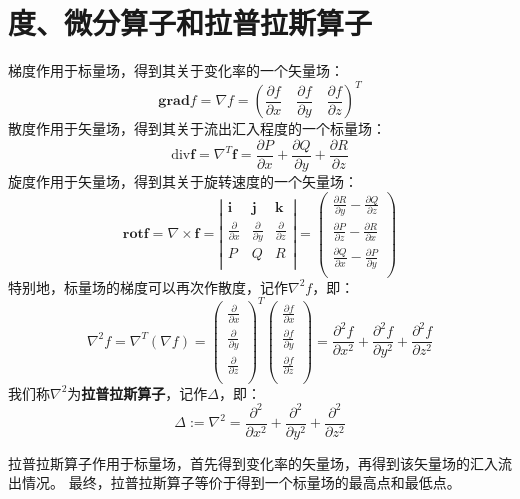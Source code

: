 \section{度、微分算子和拉普拉斯算子}

梯度作用于标量场，得到其关于变化率的一个矢量场：
\[
\mathbf{grad}f=\nabla f=\left( \frac{\partial f}{\partial x} \quad \frac{\partial f}{\partial y} \quad \frac{\partial f}{\partial z} \right) ^T
\]
散度作用于矢量场，得到其关于流出汇入程度的一个标量场：
\[
\mathrm{div}\boldsymbol{f}=\nabla ^T\boldsymbol{f}=\frac{\partial P}{\partial x}+\frac{\partial Q}{\partial y}+\frac{\partial R}{\partial z}
\]
旋度作用于矢量场，得到其关于旋转速度的一个矢量场：
\[
\mathbf{rot}\boldsymbol{f}=\nabla \times \boldsymbol{f}=\left| \begin{matrix}
	\mathbf{i}&		\mathbf{j}&		\mathbf{k}\\
	\frac{\partial}{\partial x}&		\frac{\partial}{\partial y}&		\frac{\partial}{\partial z}\\
	P&		Q&		R\\
\end{matrix} \right|=\left( \begin{array}{c}
	\frac{\partial R}{\partial y}-\frac{\partial Q}{\partial z}\\
	\frac{\partial P}{\partial z}-\frac{\partial R}{\partial x}\\
	\frac{\partial Q}{\partial x}-\frac{\partial P}{\partial y}\\
\end{array} \right)
\]
特别地，标量场的梯度可以再次作散度，记作$\nabla ^2f$，即：
\[
\nabla ^2f=\nabla ^T\left( \nabla f \right) =\left( \begin{array}{c}
	\frac{\partial}{\partial x}\\
	\frac{\partial}{\partial y}\\
	\frac{\partial}{\partial z}\\
\end{array} \right) ^T\left( \begin{array}{c}
	\frac{\partial f}{\partial x}\\
	\frac{\partial f}{\partial y}\\
	\frac{\partial f}{\partial z}\\
\end{array} \right) =\frac{\partial ^2f}{\partial x^2}+\frac{\partial ^2f}{\partial y^2}+\frac{\partial ^2f}{\partial z^2}
\]
我们称$\nabla ^2$为{\bf 拉普拉斯算子}，记作$\Delta $，即：
\[
\Delta :=\nabla ^2=\frac{\partial ^2}{\partial x^2}+\frac{\partial ^2}{\partial y^2}+\frac{\partial ^2}{\partial z^2}
\]

拉普拉斯算子作用于标量场，首先得到变化率的矢量场，再得到该矢量场的汇入流出情况。
最终，拉普拉斯算子等价于得到一个标量场的最高点和最低点。





